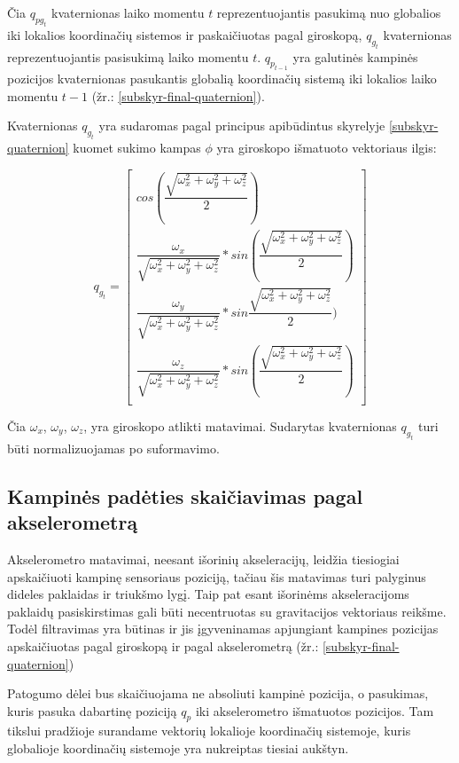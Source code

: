 \documentclass[12pt, a4paper, lithuanian, final]{article}
\begin{document}
Čia $q_{pg_{t}}$ kvaternionas laiko momentu $t$ reprezentuojantis pasukimą nuo globalios iki lokalios koordinačių sistemos ir paskaičiuotas pagal giroskopą, $q_{g_{t}}$ kvaternionas reprezentuojantis pasisukimą laiko momentu $t$.
$q_{p_{t-1}}$ yra galutinės kampinės pozicijos kvaternionas pasukantis globalią koordinačių sistemą iki lokalios laiko momentu $t-1$ (žr.: \ref{subskyr-final-quaternion}).

Kvaternionas $q_{g_{t}}$ yra sudaromas pagal principus apibūdintus skyrelyje \ref{subskyr-quaternion} kuomet sukimo kampas $\phi$ yra giroskopo išmatuoto vektoriaus ilgis:

\begin{equation}
	q_{g_{t}} = \left[
		\begin{array}{c}
			cos(\dfrac{\sqrt{\omega_x^2 + \omega_y^2 + \omega_z^2}}{2}) \\
			\dfrac{\omega_x}{\sqrt{\omega_x^2 + \omega_y^2 + \omega_z^2}} * sin(\dfrac{\sqrt{\omega_x^2 + \omega_y^2 + \omega_z^2}}{2}) \\
			\dfrac{\omega_y}{\sqrt{\omega_x^2 + \omega_y^2 + \omega_z^2}} * sin\dfrac{\sqrt{\omega_x^2 + \omega_y^2 + \omega_z^2}}{2}) \\
			\dfrac{\omega_z}{\sqrt{\omega_x^2 + \omega_y^2 + \omega_z^2}} * sin(\dfrac{\sqrt{\omega_x^2 + \omega_y^2 + \omega_z^2}}{2}) \\
		\end{array}
	\right]
\end{equation}

Čia $\omega_x$, $\omega_y$, $\omega_z$, yra giroskopo atlikti matavimai.
Sudarytas kvaternionas $q_{g_t}$ turi būti normalizuojamas po suformavimo.


\subsection{Kampinės padėties skaičiavimas pagal akselerometrą}

Akselerometro matavimai, neesant išorinių akseleracijų, leidžia tiesiogiai apskaičiuoti kampinę sensoriaus poziciją, tačiau šis matavimas turi palyginus dideles paklaidas ir triukšmo lygį.
Taip pat esant išorinėms akseleracijoms paklaidų pasiskirstimas gali būti necentruotas su gravitacijos vektoriaus reikšme.
Todėl filtravimas yra būtinas ir jis įgyveninamas apjungiant kampines pozicijas apskaičiuotas pagal giroskopą ir pagal akselerometrą (žr.: \ref{subskyr-final-quaternion})

Patogumo dėlei bus skaičiuojama ne absoliuti kampinė pozicija, o pasukimas, kuris pasuka dabartinę poziciją $q_p$ iki akselerometro išmatuotos pozicijos.
Tam tikslui pradžioje surandame vektorių lokalioje koordinačių sistemoje, kuris globalioje koordinačių sistemoje yra nukreiptas tiesiai aukštyn.
\end{document}
